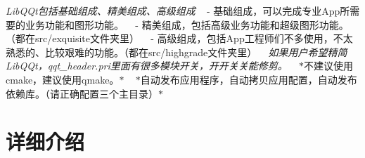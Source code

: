 {\itshape Lib\+Q\+Qt包括基础组成、精美组成、高级组成} ~\newline
-\/ 基础组成，可以完成专业\+App所需要的业务功能和图形功能。 ~\newline
-\/ 精美组成，包括高级业务功能和超级图形功能。（都在src/exquisite文件夹里） ~\newline
-\/ 高级组成，包括\+App工程师们不多使用，不太熟悉的、比较艰难的功能。（都在src/highgrade文件夹里） ~\newline
 {\itshape 如果用户希望精简\+Lib\+Q\+Qt，qqt\+\_\+header.\+pri里面有很多模块开关，开开关关能修剪。} ~\newline
$\ast$不建议使用cmake，建议使用qmake。$\ast$ ~\newline
$\ast$自动发布应用程序，自动拷贝应用配置，自动发布依赖库。（请正确配置三个主目录）$\ast$ ~\newline
 

 \section*{详细介绍}


